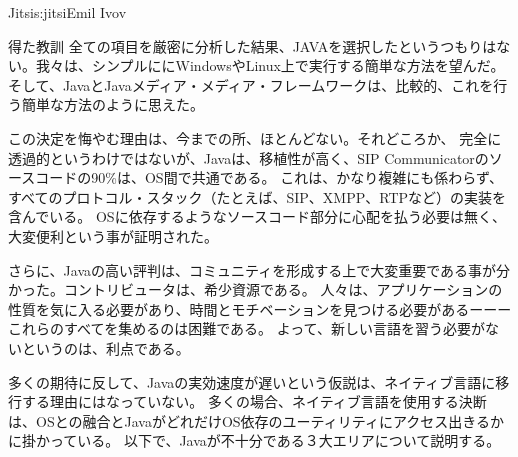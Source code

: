 \begin{aosachapter}{Jitsi}{s:jitsi}{Emil Ivov}
\begin{aosasect1}{得た教訓}
全ての項目を厳密に分析した結果、JAVAを選択したというつもりはない。我々は、シンプルににWindowsやLinux上で実行する簡単な方法を望んだ。
そして、JavaとJavaメディア・メディア・フレームワークは、比較的、これを行う簡単な方法のように思えた。

この決定を悔やむ理由は、今までの所、ほとんどない。それどころか、
完全に透過的というわけではないが、Javaは、移植性が高く、SIP Communicatorのソースコードの90\%は、OS間で共通である。
これは、かなり複雑にも係わらず、すべてのプロトコル・スタック（たとえば、SIP、XMPP、RTPなど）の実装を含んでいる。
OSに依存するようなソースコード部分に心配を払う必要は無く、大変便利という事が証明された。

さらに、Javaの高い評判は、コミュニティを形成する上で大変重要である事が分かった。コントリビュータは、希少資源である。
人々は、アプリケーションの性質を気に入る必要があり、時間とモチベーションを見つける必要があるーーーこれらのすべてを集めるのは困難である。
よって、新しい言語を習う必要がないというのは、利点である。

多くの期待に反して、Javaの実効速度が遅いという仮説は、ネイティブ言語に移行する理由にはなっていない。
多くの場合、ネイティブ言語を使用する決断は、OSとの融合とJavaがどれだけOS依存のユーティリティにアクセス出きるかに掛かっている。
以下で、Javaが不十分である３大エリアについて説明する。


\end{aosasect1}
\end{aosachapter}
